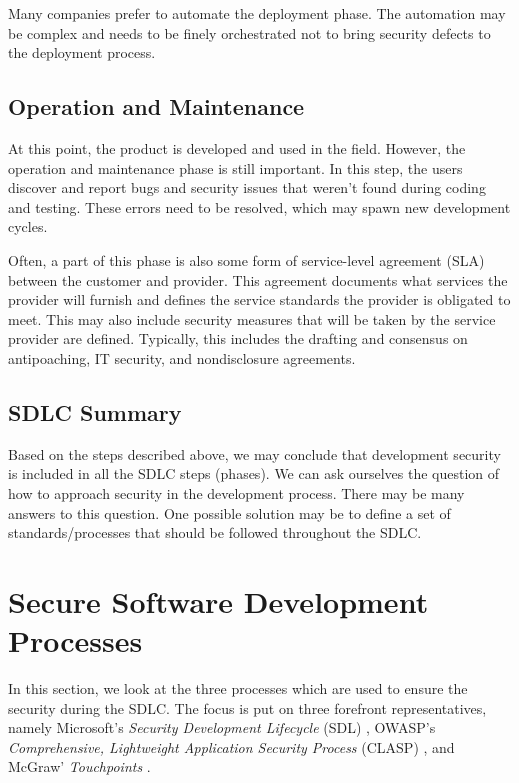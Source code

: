 \documentclass[12pt,a4,twoside]{article}
\begin{document}
Many companies prefer to automate the deployment phase. The automation may be complex and needs to be finely orchestrated not to bring security defects to the deployment process. \cite{sdlc_phoenix}

\subsection{Operation and Maintenance}

At this point, the product is developed and used in the field. However, the operation and maintenance phase is still important. In this step, the users discover and report bugs and security issues that weren't found during coding and testing. These errors need to be resolved, which may spawn new development cycles. \cite{sdlc_phoenix}

Often, a part of this phase is also some form of service-level agreement (SLA) between the customer and provider. This agreement documents what services the provider will furnish and defines the service standards the provider is obligated to meet. This may also include security measures that will be taken by the service provider are defined. Typically, this includes the drafting and consensus on antipoaching, IT security, and nondisclosure agreements. \cite{sla}

\subsection{SDLC Summary}

Based on the steps described above, we may conclude that development security is included in all the SDLC steps (phases). We can ask ourselves the question of how to approach security in the development process. There may be many answers to this question. One possible solution may be to define a set of standards/processes that should be followed throughout the SDLC.

\section{Secure Software Development Processes}

In this section, we look at the three processes which are used to ensure the security during the SDLC. The focus is put on three forefront representatives, namely Microsoft's \textit{Security Development Lifecycle} (SDL) \cite{microsoft_sdl}, OWASP’s \textit{Comprehensive, Lightweight Application Security Process} (CLASP) \cite{owasp}, and McGraw' \textit{Touchpoints} \cite{mcgraw2004software}.
\end{document}
